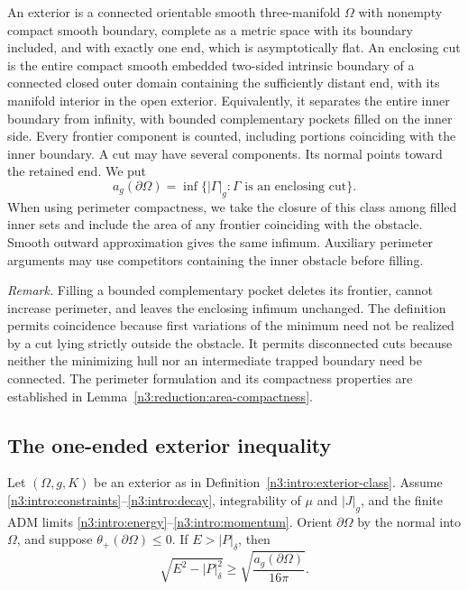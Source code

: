 \begin{definition}\label{n3:intro:exterior-class}
An exterior is a connected orientable smooth three-manifold \(\Omega\)
with nonempty compact smooth boundary, complete as a metric space with
its boundary included, and with exactly one end, which is asymptotically flat.
An enclosing cut is the entire compact smooth embedded two-sided intrinsic
boundary of a connected closed outer domain containing the sufficiently
distant end, with its manifold interior in the open exterior. Equivalently,
it separates the entire inner boundary from infinity, with bounded
complementary pockets filled on the inner side. Every frontier component is
counted, including portions coinciding with the inner boundary. A cut may
have several components. Its normal points toward the retained end. We put
\[
 a_g(\partial\Omega)=
  \inf\{|\Gamma|_g:\Gamma\text{ is an enclosing cut}\}.
\]
When using perimeter compactness, we take the closure of this class
among filled inner sets and include the area of any frontier coinciding
with the obstacle. Smooth outward approximation gives the same
infimum. Auxiliary perimeter arguments may use
competitors containing the inner obstacle before filling.
\end{definition}

\noindent\emph{Remark.} Filling a bounded complementary pocket deletes
its frontier, cannot increase perimeter, and leaves the enclosing
infimum unchanged. The definition permits coincidence because first variations of the
minimum need not be realized by a cut lying strictly outside the
obstacle. It permits disconnected cuts because neither the minimizing
hull nor an intermediate trapped boundary need be connected. The
perimeter formulation and its compactness properties are established
in Lemma~\ref{n3:reduction:area-compactness}.

\subsection{The one-ended exterior inequality}

\begin{theorem}\label{n3:intro:exterior-inequality}
Let \((\Omega,g,K)\) be an exterior as in
Definition~\ref{n3:intro:exterior-class}. Assume
\eqref{n3:intro:constraints}--\eqref{n3:intro:decay}, integrability
of \(\mu\) and \(|J|_g\), and the finite ADM limits
\eqref{n3:intro:energy}--\eqref{n3:intro:momentum}. Orient \(\partial\Omega\)
by the normal into \(\Omega\), and suppose
\(\theta_+(\partial\Omega)\le0\). If \(E>|P|_\delta\), then
\begin{equation}\label{n3:intro:penrose}
          \sqrt{E^2-|P|_\delta^2}
               \ge \sqrt{\frac{a_g(\partial\Omega)}{16\pi}}.
\end{equation}
\end{theorem}


